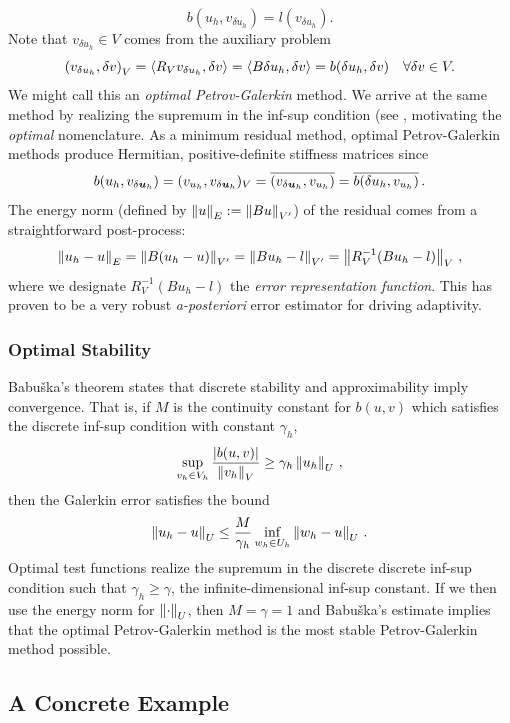 \documentclass{article}
\begin{document}
\begin{equation*}
b(u_h,v_{\delta u_h})=l(v_{\delta u_h}).
\end{equation*}
Note that $v_{\delta u_h}\in V$ comes from the auxiliary problem
\begin{equation*}
\left( v_{\delta u_h},\delta v \right)_V=\left\langle R_Vv_{\delta u_h},\delta v \right\rangle
=\left\langle B\delta u_h,\delta v \right\rangle=b(\delta u_h,\delta v)\quad\forall\delta v\in V.
\end{equation*}
We might call this an \emph{optimal Petrov-Galerkin} method.
We arrive at the same method by realizing the supremum in the inf-sup condition (see \cite{DPGOverview}, motivating the \emph{optimal} nomenclature.
As a minimum residual method, optimal Petrov-Galerkin methods produce Hermitian, positive-definite stiffness matrices since
\[
b(u_h,v_{\delta\boldsymbol{u}_h})=(v_{u_h},v_{\delta\boldsymbol{u}_h})_V=\overline{(v_{\delta\boldsymbol{u}_h},v_{u_h})}=\overline{b(\delta u_h,v_{u_h})}\,.
\]
The energy norm (defined by $\left\| u \right\|_E:=\left\| Bu \right\|_{V'}$) of the residual comes from a straightforward post-process:
\[
\left\| u_h-u \right\|_E=\left\| B(u_h-u) \right\|_{V'}=\left\| Bu_h-l \right\|_{V'}=\left\| R_V^{-1}(Bu_h-l) \right\|_V\,,
\]
where we designate $R_V^{-1}(Bu_h-l)$ the \emph{error representation function}.
This has proven to be a very robust \emph{a-posteriori} error estimator for driving adaptivity.

\subsubsection{Optimal Stability}
Babu\v{s}ka's theorem \cite{Babuska70} states that discrete stability and approximability imply convergence.
That is, if $M$ is the continuity constant for $b(u,v)$ which satisfies the discrete inf-sup condition with constant $\gamma_h$,
\[
\sup_{v_h\in V_h}\frac{|b(u,v)|}{\left\| v_h \right\|_V}\geq\gamma_h\left\| u_h \right\|_U\,,
\]
then the Galerkin error satisfies the bound
\[
\left\| u_h-u \right\|_U\leq\frac{M}{\gamma_h}\inf_{w_h\in U_h}\left\| w_h-u \right\|_U\,.
\]
Optimal test functions realize the supremum in the discrete discrete inf-sup condition such that $\gamma_h\geq\gamma$, 
the infinite-dimensional inf-sup constant.
If we then use the energy norm for $\left\| \cdot \right\|_U$, then $M=\gamma=1$ and Babu\v{s}ka's estimate implies that
the optimal Petrov-Galerkin method is the most stable Petrov-Galerkin method possible.

\subsection{A Concrete Example}
\end{document}

